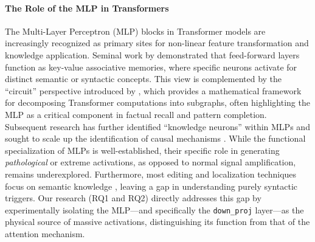 \documentclass[conference]{IEEEtran}
\begin{document}
\paragraph{The Role of the MLP in Transformers} The Multi-Layer Perceptron (MLP) blocks in Transformer models are increasingly recognized as primary sites for non-linear feature transformation and knowledge application. Seminal work by \cite{geva2022transformer} demonstrated that feed-forward layers function as key-value associative memories, where specific neurons activate for distinct semantic or syntactic concepts. This view is complemented by the “circuit” perspective introduced by \cite{elhage2021mathematical}, which provides a mathematical framework for decomposing Transformer computations into subgraphs, often highlighting the MLP as a critical component in factual recall and pattern completion. Subsequent research has further identified “knowledge neurons” within MLPs \cite{dai2022knowledge} and sought to scale up the identification of causal mechanisms \cite{wang2023interpret}. While the functional specialization of MLPs is well-established, their specific role in generating \textit{pathological} or extreme activations, as opposed to normal signal amplification, remains underexplored. Furthermore, most editing and localization techniques focus on semantic knowledge \cite{liu2024locating}, leaving a gap in understanding purely syntactic triggers. Our research (RQ1 and RQ2) directly addresses this gap by experimentally isolating the MLP—and specifically the \texttt{down\_proj} layer—as the physical source of massive activations, distinguishing its function from that of the attention mechanism.
\end{document}
